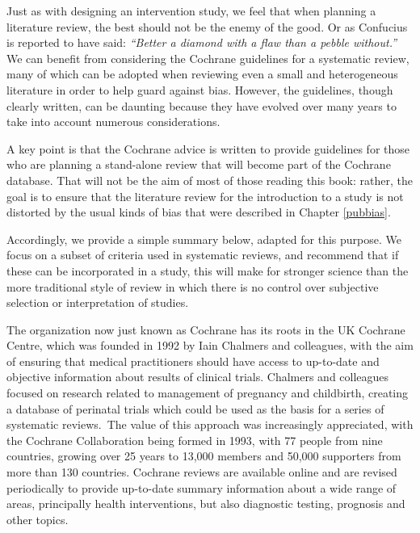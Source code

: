 \documentclass{krantz}
\begin{document}
Just as with designing an intervention study, we feel that when planning a literature review, the best should not be the enemy of the good. Or as Confucius is reported to have said: \emph{``Better a diamond with a flaw than a pebble without.''} We can benefit from considering the Cochrane guidelines for a systematic review, many of which can be adopted when reviewing even a small and heterogeneous literature in order to help guard against bias. However, the guidelines, though clearly written, can be daunting because they have evolved over many years to take into account numerous considerations.

A key point is that the Cochrane advice is written to provide guidelines for those who are planning a stand-alone review that will become part of the Cochrane database. That will not be the aim of most of those reading this book: rather, the goal is to ensure that the literature review for the introduction to a study is not distorted by the usual kinds of bias that were described in Chapter \ref{pubbias}.

Accordingly, we provide a simple summary below, adapted for this purpose. We focus on a subset of criteria used in systematic reviews, and recommend that if these can be incorporated in a study, this will make for stronger science than the more traditional style of review in which there is no control over subjective selection or interpretation of studies.

\begin{tcolorbox}[colback=Black!5!lightgray,colframe=black!75!black,coltitle=white,title=History of Cochrane]\label{box:Cochrane}
The organization now just known as Cochrane has its roots in the UK Cochrane Centre, which was founded in 1992 by Iain Chalmers and colleagues, with the aim of ensuring that medical practitioners should have access to up-to-date and objective information about results of clinical trials. Chalmers and colleagues focused on research related to management of pregnancy and childbirth, creating a database of perinatal trials which could be used as the basis for a series of systematic reviews.\
The value of this approach was increasingly appreciated, with the Cochrane Collaboration being formed in 1993, with 77 people from nine countries, growing over 25 years to 13,000 members and 50,000 supporters from more than 130 countries. Cochrane reviews are available online and are revised periodically to provide up-to-date summary information about a wide range of areas, principally health interventions, but also diagnostic testing, prognosis and other topics.

\end{tcolorbox}
\end{document}
